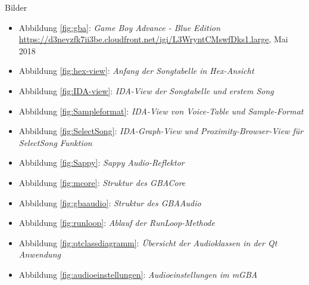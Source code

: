 \documentclass[11pt,a4paper]{scrartcl}
\begin{document}
\vspace{1cm}

\huge Bilder
\normalsize

\begin{itemize}
    \item Abbildung \ref{fig:gba}: \textit{Game Boy Advance - Blue Edition}\newline
    \url{https://d3nevzfk7ii3be.cloudfront.net/igi/L3WryntCMswfDks1.large}, Mai 2018

    \item Abbildung \ref{fig:hex-view}: \textit{Anfang der Songtabelle in Hex-Ansicht}
    
    \item Abbildung \ref{fig:IDA-view}: \textit{IDA-View der Songtabelle und erstem Song}
    
    \item Abbildung \ref{fig:Sampleformat}: \textit{IDA-View von Voice-Table und Sample-Format}
		
		\item Abbildung \ref{fig:SelectSong}: \textit{IDA-Graph-View und Proximity-Browser-View f\"ur SelectSong Funktion}
		
		\item Abbildung \ref{fig:Sappy}: \textit{Sappy Audio-Reflektor}
    
    \item Abbildung \ref{fig:mcore}: \textit{Struktur des GBACore}
    
    \item Abbildung \ref{fig:gbaaudio}: \textit{Struktur des GBAAudio}
    
    \item Abbildung \ref{fig:runloop}: \textit{Ablauf der RunLoop-Methode}
    
    \item Abbildung \ref{fig:qtclassdiagramm}: \textit{\"Ubersicht der Audioklassen in der Qt Anwendung}
    
    \item Abbildung \ref{fig:audioeinstellungen}: \textit{Audioeinstellungen im mGBA}
\end{itemize}
\end{document}
